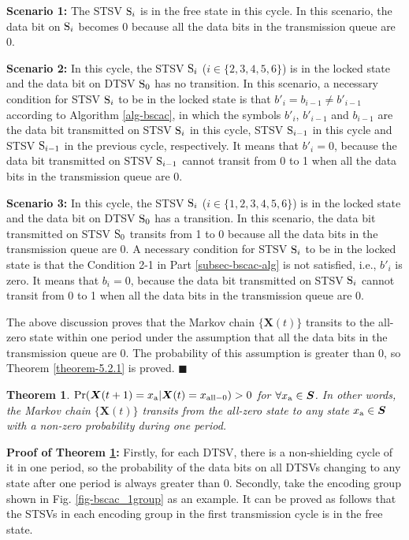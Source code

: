 \documentclass[lettersize,journal]{IEEEtran}
\newtheorem{theorem}{Theorem}
\newcommand{\qedblacksquare}{\hfill $\blacksquare$}
\begin{document}
{{\bf Scenario 1:} The STSV ${\rm S}_i$ is in the free state in this cycle. In this scenario, the data bit on ${\rm S}_i$ becomes 0 because all the data bits in the transmission queue are 0.

{\bf Scenario 2:} In this cycle, the STSV ${\rm S}_i$ ($i\in \{2,3,4,5,6\}$) is in the locked state and the data bit on DTSV ${\rm S}_0$ has no transition. In this scenario, a necessary condition for STSV ${\rm S}_i$ to be in the locked state is that ${b'}_i=b_{i-1}\neq {b'}_{i-1}$ according to Algorithm \ref{alg-bscac}, in which the symbols ${b'}_i$, ${b'}_{i-1}$ and $b_{i-1}$ are the data bit transmitted on STSV ${\rm S}_i$ in this cycle, STSV ${\rm S}_{i-1}$ in this cycle and STSV ${\rm S}_{i-1}$ in the previous cycle, respectively. It means that ${b'}_i=0$, because the data bit transmitted on STSV ${\rm S}_{i-1}$ cannot transit from 0 to 1 when all the data bits in the transmission queue are 0.

{\bf Scenario 3:} In this cycle, the STSV ${\rm S}_i$ ($i\in \{1,2,3,4,5,6\}$) is in the locked state and the data bit on DTSV ${\rm S}_0$ has a transition. In this scenario, the data bit transmitted on STSV ${\rm S}_0$ transits from 1 to 0 because all the data bits in the transmission queue are 0. A necessary condition for STSV ${\rm S}_i$ to be in the locked state is that the Condition 2-1 in Part \ref{subsec-bscac-alg} is not satisfied, i.e., ${b'}_i$ is zero. It means that $b_i=0$, because the data bit transmitted on STSV ${\rm S}_i$ cannot transit from 0 to 1 when all the data bits in the transmission queue are 0. 

The above discussion proves that the Markov chain $\{\boldsymbol{X}(t)\}$ transits to the all-zero state within one period under the assumption that all the data bits in the transmission queue are 0. The probability of this assumption is greater than 0, so Theorem \ref{theorem-5.2.1} is proved. \qedblacksquare
\begin{theorem}\label{theorem-5.2.2}
	${\rm Pr}( \boldsymbol{X}(t+1) = x_{\rm a} | \boldsymbol{X}(t) = x_{\rm all-0})>0$ for $\forall x_{\rm a}\in \boldsymbol{S}$. In other words, the Markov chain $\{\boldsymbol{X}(t)\}$ transits from the all-zero state to any state $x_{\rm a}\in \boldsymbol{S}$ with a non-zero probability during one period.
\end{theorem}

\noindent \textbf{Proof of Theorem \ref{theorem-5.2.2}:} Firstly, for each DTSV, there is a non-shielding cycle of it in one period, so the probability of the data bits on all DTSVs changing to any state after one period is always greater than 0. Secondly, take the encoding group shown in Fig. \ref{fig-bscac_1group} as an example. It can be proved as follows that the STSVs in each encoding group in the first transmission cycle is in the free state.

}
\end{document}
